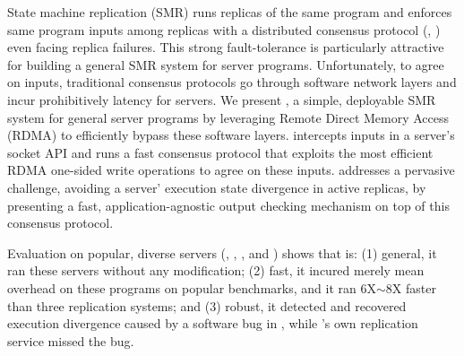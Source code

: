 

State machine replication (SMR) runs replicas of the same program and 
enforces same program inputs among replicas with a distributed consensus 
protocol (\eg, \paxos) even facing replica failures. This strong 
fault-tolerance is particularly attractive for building a general SMR system 
for server programs. Unfortunately, to agree on inputs, traditional consensus 
protocols go through software network layers and incur prohibitively latency 
for servers. We present \xxx, a simple, deployable SMR system for general 
server programs by leveraging Remote Direct Memory Access (RDMA) to efficiently 
bypass these software layers. \xxx intercepts inputs in a server's socket API 
and runs a fast consensus protocol that exploits the most efficient RDMA 
one-sided write operations to agree on these inputs. \xxx addresses a pervasive 
challenge, avoiding a server' execution state divergence in active 
replicas, by presenting a fast, application-agnostic output checking mechanism 
on top of this consensus protocol.
% 

Evaluation on \nprog popular, diverse servers (\eg, \memcached, \mysql, 
and \clamav) shows that \xxx is: (1) general, it ran these servers without any 
modification; (2) fast, it incured merely \overhead mean overhead 
on these programs on popular benchmarks, and it ran 6X$\sim$8X faster than 
three replication systems; and (3) robust, it detected and recovered execution 
divergence caused by a software bug in \redis, while \redis's own replication 
service missed the bug.


